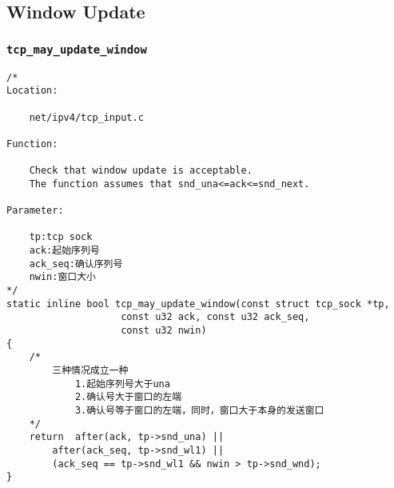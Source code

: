 	\subsection{Window Update}
		\subsubsection{\texttt{tcp_may_update_window}}
			\label{WindowUpdate:tcp_may_update_window}
\begin{verbatim}
/* 
Location:

	net/ipv4/tcp_input.c

Function:

	Check that window update is acceptable.
	The function assumes that snd_una<=ack<=snd_next.

Parameter:

	tp:tcp sock
	ack:起始序列号
	ack_seq:确认序列号
	nwin:窗口大小
*/
static inline bool tcp_may_update_window(const struct tcp_sock *tp,
					const u32 ack, const u32 ack_seq,
					const u32 nwin)
{
	/*
		三种情况成立一种
			1.起始序列号大于una
			2.确认号大于窗口的左端
			3.确认号等于窗口的左端，同时，窗口大于本身的发送窗口
	*/
	return	after(ack, tp->snd_una) ||
		after(ack_seq, tp->snd_wl1) ||
		(ack_seq == tp->snd_wl1 && nwin > tp->snd_wnd);
}
\end{verbatim}
